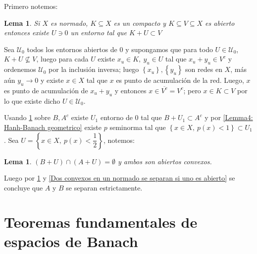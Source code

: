 \documentclass[11pt]{article}
\newcommand{\sett}[1]{\left\lbrace#1\right\rbrace}
\numberwithin{theorem}{subsection}
\newtheorem{lemma}[theorem]{Lema}
\newenvironment{proof}[1][Demostraci\'on]{\begin{trivlist}
		\item[\hskip \labelsep {\bfseries #1}]}{\end{trivlist}}
\newcommand{\qed}{\nobreak \ifvmode \relax \else
	\ifdim\lastskip<1.5em \hskip-\lastskip
	\hskip1.5em plus0em minus0.5em \fi \nobreak
	\vrule height0.75em width0.5em depth0.25em\fi}
\begin{document}
\begin{proof}
	Primero notemos:

\begin{lemma}
	\label{Lemma1: Un cerrado se separa de un compacto}
	Si $X$ es normado, $K \subseteq X$ es un compacto y $K \subseteq V \subseteq X$ es abierto entonces existe $U \ni 0$ un entorno tal que $K + U \subset V$
\end{lemma}

\begin{proof}[Demostraci\'on del lema]
	Sea $\mathcal{U}_0$ todos los entornos abiertos de $0$ y supongamos que para todo $U \in \mathcal{U}_0$, $K+U \not \subseteq V$, luego para cada $U$ existe $x_u \in K, \ y_u \in U$ tal que $x_u+y_u \in V^{c}$ y ordenemos $\mathcal{U}_0$ por la inclusi\'on inversa; luego $\sett{x_u},\sett{y_u}$ son redes en $X$, m\'as a\'un $y_u \rightarrow 0$ y existe $x \in X$ tal que $x$ es punto de acumulaci\'on de la red. Luego, $x$ es punto de acumulaci\'on de $x_u+y_u$ y entonces $x \in \overline{V^{c}} = V^{c}$; pero $x \in K \subset V$ por lo que existe dicho $U \in \mathcal{U}_0$. \qed
\end{proof}

Usando \ref{Lemma1: Un cerrado se separa de un compacto} sobre $B, A^{c}$ existe $U_1$ entorno de $0$ tal que $B+U_1 \subset A^c$ y por \ref{Lemma4: Hanh-Banach geometrico} existe $p$ seminorma tal que $\sett{x \in X, \ p(x) < 1} \subset U_1$. Sea $U = \sett{x \in X, \ p(x) < \dfrac{1}{2}}$, notemos:

\begin{lemma}
	\label{Lemma2: Un cerrado se separa de un compacto}
	 $\left(B+U\right)\cap \left(A + U\right) = \emptyset$ y ambos son abiertos convexos.
\end{lemma}

Luego por \ref{Lemma2: Un cerrado se separa de un compacto} y \ref{Dos convexos en un normado se separan si uno es abierto} se concluye que $A$ y $B$ se separan estrictamente.

\end{proof}


\section{Teoremas fundamentales de espacios de Banach}
\end{document}
